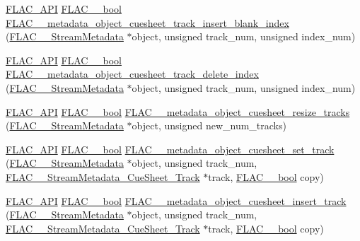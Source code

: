 \begin{DoxyCompactItemize}
\item 
\hyperlink{group__flac__export_ga56ca07df8a23310707732b1c0007d6f5}{F\+L\+A\+C\+\_\+\+A\+PI} \hyperlink{ordinals_8h_a95103469f1cbd78b8cf250194985b34e}{F\+L\+A\+C\+\_\+\+\_\+bool} \hyperlink{group__flac__metadata__object_gaa1401ea99e4dc61d3eb034aed7d99602}{F\+L\+A\+C\+\_\+\+\_\+metadata\+\_\+object\+\_\+cuesheet\+\_\+track\+\_\+insert\+\_\+blank\+\_\+index} (\hyperlink{struct_f_l_a_c_____stream_metadata}{F\+L\+A\+C\+\_\+\+\_\+\+Stream\+Metadata} $\ast$object, unsigned track\+\_\+num, unsigned index\+\_\+num)
\item 
\hyperlink{group__flac__export_ga56ca07df8a23310707732b1c0007d6f5}{F\+L\+A\+C\+\_\+\+A\+PI} \hyperlink{ordinals_8h_a95103469f1cbd78b8cf250194985b34e}{F\+L\+A\+C\+\_\+\+\_\+bool} \hyperlink{group__flac__metadata__object_ga9cba3429dcc863714ceb1de6952c4737}{F\+L\+A\+C\+\_\+\+\_\+metadata\+\_\+object\+\_\+cuesheet\+\_\+track\+\_\+delete\+\_\+index} (\hyperlink{struct_f_l_a_c_____stream_metadata}{F\+L\+A\+C\+\_\+\+\_\+\+Stream\+Metadata} $\ast$object, unsigned track\+\_\+num, unsigned index\+\_\+num)
\item 
\hyperlink{group__flac__export_ga56ca07df8a23310707732b1c0007d6f5}{F\+L\+A\+C\+\_\+\+A\+PI} \hyperlink{ordinals_8h_a95103469f1cbd78b8cf250194985b34e}{F\+L\+A\+C\+\_\+\+\_\+bool} \hyperlink{group__flac__metadata__object_gafb0e09fdcfb08c466ceb1f6bca961177}{F\+L\+A\+C\+\_\+\+\_\+metadata\+\_\+object\+\_\+cuesheet\+\_\+resize\+\_\+tracks} (\hyperlink{struct_f_l_a_c_____stream_metadata}{F\+L\+A\+C\+\_\+\+\_\+\+Stream\+Metadata} $\ast$object, unsigned new\+\_\+num\+\_\+tracks)
\item 
\hyperlink{group__flac__export_ga56ca07df8a23310707732b1c0007d6f5}{F\+L\+A\+C\+\_\+\+A\+PI} \hyperlink{ordinals_8h_a95103469f1cbd78b8cf250194985b34e}{F\+L\+A\+C\+\_\+\+\_\+bool} \hyperlink{group__flac__metadata__object_ga682176f845b99956b3974bcc1bb63a20}{F\+L\+A\+C\+\_\+\+\_\+metadata\+\_\+object\+\_\+cuesheet\+\_\+set\+\_\+track} (\hyperlink{struct_f_l_a_c_____stream_metadata}{F\+L\+A\+C\+\_\+\+\_\+\+Stream\+Metadata} $\ast$object, unsigned track\+\_\+num, \hyperlink{struct_f_l_a_c_____stream_metadata___cue_sheet___track}{F\+L\+A\+C\+\_\+\+\_\+\+Stream\+Metadata\+\_\+\+Cue\+Sheet\+\_\+\+Track} $\ast$track, \hyperlink{ordinals_8h_a95103469f1cbd78b8cf250194985b34e}{F\+L\+A\+C\+\_\+\+\_\+bool} copy)
\item 
\hyperlink{group__flac__export_ga56ca07df8a23310707732b1c0007d6f5}{F\+L\+A\+C\+\_\+\+A\+PI} \hyperlink{ordinals_8h_a95103469f1cbd78b8cf250194985b34e}{F\+L\+A\+C\+\_\+\+\_\+bool} \hyperlink{group__flac__metadata__object_ga5dbdffac2cd7e327f711103c15e015ac}{F\+L\+A\+C\+\_\+\+\_\+metadata\+\_\+object\+\_\+cuesheet\+\_\+insert\+\_\+track} (\hyperlink{struct_f_l_a_c_____stream_metadata}{F\+L\+A\+C\+\_\+\+\_\+\+Stream\+Metadata} $\ast$object, unsigned track\+\_\+num, \hyperlink{struct_f_l_a_c_____stream_metadata___cue_sheet___track}{F\+L\+A\+C\+\_\+\+\_\+\+Stream\+Metadata\+\_\+\+Cue\+Sheet\+\_\+\+Track} $\ast$track, \hyperlink{ordinals_8h_a95103469f1cbd78b8cf250194985b34e}{F\+L\+A\+C\+\_\+\+\_\+bool} copy)

\end{DoxyCompactItemize}
